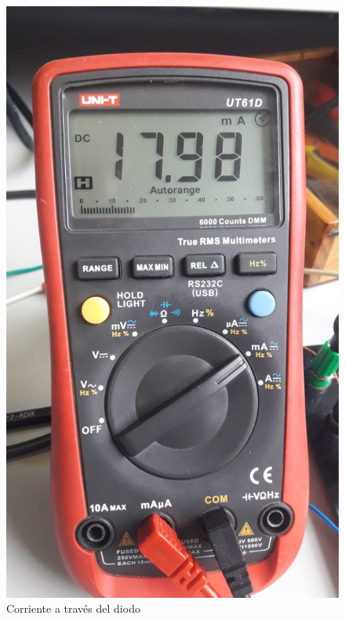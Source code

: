 \begin{figure}[H]
\begin{minipage}[c]{0.4\linewidth}
    \includegraphics[scale=0.22]{Imagenes/7Resultados/Idiodo.jpeg}
    \caption{Corriente a través del diodo}
    \label{fig:figura2}
\end{minipage}
\end{figure}

